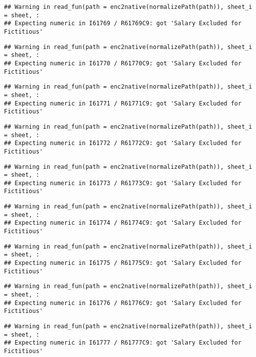 \documentclass[
]{article}
\begin{document}
\begin{verbatim}
## Warning in read_fun(path = enc2native(normalizePath(path)), sheet_i = sheet, :
## Expecting numeric in I61769 / R61769C9: got 'Salary Excluded for Fictitious'
\end{verbatim}

\begin{verbatim}
## Warning in read_fun(path = enc2native(normalizePath(path)), sheet_i = sheet, :
## Expecting numeric in I61770 / R61770C9: got 'Salary Excluded for Fictitious'
\end{verbatim}

\begin{verbatim}
## Warning in read_fun(path = enc2native(normalizePath(path)), sheet_i = sheet, :
## Expecting numeric in I61771 / R61771C9: got 'Salary Excluded for Fictitious'
\end{verbatim}

\begin{verbatim}
## Warning in read_fun(path = enc2native(normalizePath(path)), sheet_i = sheet, :
## Expecting numeric in I61772 / R61772C9: got 'Salary Excluded for Fictitious'
\end{verbatim}

\begin{verbatim}
## Warning in read_fun(path = enc2native(normalizePath(path)), sheet_i = sheet, :
## Expecting numeric in I61773 / R61773C9: got 'Salary Excluded for Fictitious'
\end{verbatim}

\begin{verbatim}
## Warning in read_fun(path = enc2native(normalizePath(path)), sheet_i = sheet, :
## Expecting numeric in I61774 / R61774C9: got 'Salary Excluded for Fictitious'
\end{verbatim}

\begin{verbatim}
## Warning in read_fun(path = enc2native(normalizePath(path)), sheet_i = sheet, :
## Expecting numeric in I61775 / R61775C9: got 'Salary Excluded for Fictitious'
\end{verbatim}

\begin{verbatim}
## Warning in read_fun(path = enc2native(normalizePath(path)), sheet_i = sheet, :
## Expecting numeric in I61776 / R61776C9: got 'Salary Excluded for Fictitious'
\end{verbatim}

\begin{verbatim}
## Warning in read_fun(path = enc2native(normalizePath(path)), sheet_i = sheet, :
## Expecting numeric in I61777 / R61777C9: got 'Salary Excluded for Fictitious'
\end{verbatim}
\end{document}
